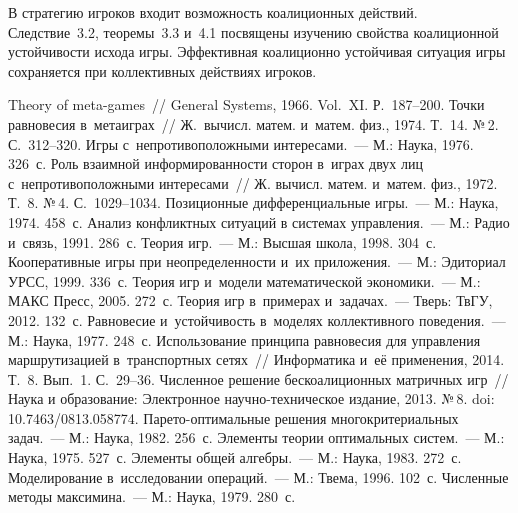 \begin{multicols}{2}
    В стратегию игроков входит возможность коалиционных действий.
Следствие~3.2, теоремы~3.3 и~4.1 посвящены изучению свойства коалиционной
устойчивости исхода игры. Эффективная коалиционно устойчивая ситуация игры
сохраняется при коллективных действиях игроков.

{\small\frenchspacing
 {%
 \begin{thebibliography}{99}

 Theory of meta-games~// General Systems,
1966. Vol.~XI. Р.~187--200.
 Точки равновесия в~метаиграх~// Ж.~вычисл. матем. и~матем.
физ., 1974. Т.~14. №\,2. С.~312--320.
 Игры с~непротивоположными интересами.~--- М.: Наука, 1976.
326~с.
 Роль взаимной информированности сторон в~играх двух лиц с~непротивоположными интересами~// Ж. вычисл. матем. и~матем. физ., 1972. Т.~8.
№\,4. С.~1029--1034.
 Позиционные дифференциальные игры.~---
М.: Наука, 1974. 458~с.
 Анализ конфликтных ситуаций
в системах управления.~--- М.: Радио и~связь, 1991. 286~с.
 Теория игр.~--- М.: Высшая
школа, 1998. 304~с.
 Кооперативные игры при неопределенности и~их
приложения.~--- М.: Эдиториал УРСС, 1999. 336~с.
 Теория игр и~модели математической
экономики.~--- М.: МАКС Пресс, 2005. 272~с.
 Теория игр в~примерах и~задачах.~--- Тверь:
ТвГУ, 2012. 132~с.
 Равновесие и~устойчивость в~моделях коллективного
поведения.~--- М.: Наука, 1977. 248~с.
 Использование принципа равновесия для управления
маршрутизацией в~транспортных сетях~// Информатика и~её применения, 2014. Т.~8.
Вып.~1. С.~29--36.
 Численное решение бескоалиционных матричных игр~// Наука
и образование: Электронное на\-уч\-но-тех\-ни\-че\-ское издание, 2013. №\,8. doi:
10.7463/0813.058774.
 Па\-ре\-то-оп\-ти\-маль\-ные решения
многокритериальных задач.~--- М.: Наука, 1982. 256~с.
 Элементы теории оптимальных сис\-тем.~--- М.: Наука, 1975.
527~с.
 Элементы общей алгебры.~--- М.: Наука, 1983. 272~с.
 Моделирование в~исследовании операций.~---
М.: Твема, 1996. 102~с.
 Численные методы максимина.~--- М.: Наука, 1979. 280~с.
 \end{thebibliography}

 }
 }

\end{multicols}

